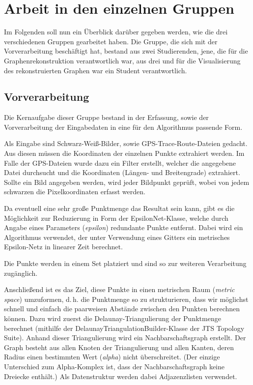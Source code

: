 \documentclass[parskip=half,
 fontsize=12pt, bibtotoc,
 titlepage, ngerman]
 {article}
\begin{document}
\section{Arbeit in den einzelnen Gruppen}
Im Folgenden soll nun ein Überblick darüber gegeben werden, wie die drei verschiedenen Gruppen gearbeitet haben. Die Gruppe, die sich mit der Vorverarbeitung beschäftigt hat, bestand aus zwei Studierenden, jene, die für die Graphenrekonstruktion verantwortlich war, aus drei und für die Visualisierung des rekonstruierten Graphen war ein Student verantwortlich.

\subsection{Vorverarbeitung}
Die Kernaufgabe dieser Gruppe bestand in der Erfassung, sowie der Vorverarbeitung der Eingabedaten in eine für den Algorithmus passende Form.

Als Eingabe sind Schwarz-Weiß-Bilder, sowie GPS-Trace-Route-Dateien gedacht. Aus diesen müssen die Koordinaten der einzelnen Punkte extrahiert werden. Im Falle der GPS-Dateien wurde dazu ein Filter erstellt, welcher die angegebene Datei durchsucht und die Koordinaten (Längen- und Breitengrade) extrahiert. Sollte ein Bild angegeben werden, wird jeder Bildpunkt geprüft, wobei von jedem schwarzen die Pixelkoordinaten erfasst werden.

Da eventuell eine sehr große Punktmenge das Resultat sein kann, gibt es die Möglichkeit zur Reduzierung in Form der EpsilonNet-Klasse, welche durch Angabe eines Parameters (\emph{epsilon}) redundante Punkte entfernt. Dabei wird ein Algorithmus verwendet, der unter Verwendung eines Gitters ein metrisches Epsilon-Netz in linearer Zeit berechnet. \cite{HarPeledEa2013}

Die Punkte werden in einem Set platziert und sind so zur weiteren Verarbeitung zugänglich.

Anschließend ist es das Ziel, diese Punkte in einen metrischen Raum (\textit{metric space}) umzuformen, d.\,h. die Punktmenge so zu strukturieren, dass wir möglichst schnell und einfach die paarweisen Abstände zwischen den Punkten berechnen können. Dazu wird zuerst die Delaunay-Triangulierung der Punktmenge berechnet (mithilfe der Delaunay\allowbreak TriangulationBuilder-Klasse der JTS Topology Suite). Anhand dieser Triangulierung wird ein Nachbarschaftsgraph erstellt. Der Graph besteht aus allen Knoten der Triangulierung und allen Kanten, deren Radius einen bestimmten Wert (\emph{alpha}) nicht überschreitet. (Der einzige Unterschied zum Alpha-Komplex ist, dass der Nachbarschaftsgraph keine Dreiecke enthält.) Als Datenstruktur werden dabei Adjazenzlisten verwendet.
\end{document}
